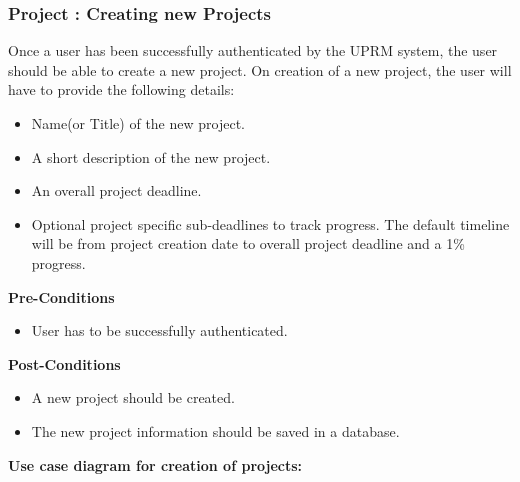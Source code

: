 \subsubsection{Project : Creating new Projects}
	Once a user has been successfully authenticated by the UPRM system, the user should be able to create a new project. On creation of a new project, the user will have to provide the following details:
	\begin{itemize}
		\item Name(or Title) of the new project.
		\item A short description of the new project.
		\item An overall project deadline.
		\item Optional project specific sub-deadlines to track progress. The default timeline will be from project creation date to overall project deadline and a 1\% progress.
	\end{itemize}
	\textbf{Pre-Conditions}
	\begin{itemize}
		\item User has to be successfully authenticated.
	\end{itemize}
	\textbf{Post-Conditions}
	\begin{itemize}
		\item A new project should be created.
		\item The new project information should be saved in a database.
	\end{itemize}
	\textbf{Use case diagram for creation of projects: }\\
	\centerline{}
	
